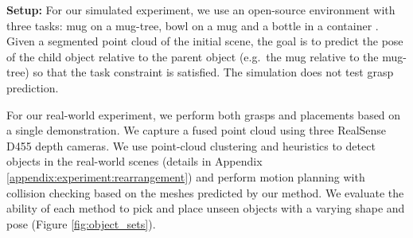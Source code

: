 \documentclass{article}
\begin{document}
\begin{table}[t!]
    \centering
    \caption{Success rates of \hl{real-world robot} pick-and-place experiments with a single demonstration. The manipulated object (e.g. a mug) starts in an arbitrary pose (we use a stand to get a range of poses) and the target object (e.g. a mug-tree) starts in an arbitrary upright pose. $^1$The target object (e.g. the mug tree) is in a fixed pose for this experiment, as NDF does not handle target object variation. Each entry is measured over 25 - 30 trials with unseen object pairs.}
    \label{tab:real_world}
\end{table}

\textbf{Setup:} For our simulated experiment, we use an open-source environment with three tasks: mug on a mug-tree, bowl on a mug and a bottle in a  container \cite{simeonov22se}. Given a segmented point cloud of the initial scene, the goal is to predict the pose of the child object relative to the parent object (e.g.~the mug relative to the mug-tree) so that the task constraint is satisfied. The simulation does not test grasp prediction.

For our real-world experiment, we perform both grasps and placements based on a single demonstration. We capture a fused point cloud using three RealSense D455 depth cameras. We use point-cloud clustering and heuristics to detect objects in the real-world scenes (details in Appendix \ref{appendix:experiment:rearrangement}) and perform motion planning with collision checking based on the meshes predicted by our method. We evaluate the ability of each method to pick and place unseen objects with a varying shape and pose (Figure \ref{fig:object_sets}).
\end{document}
